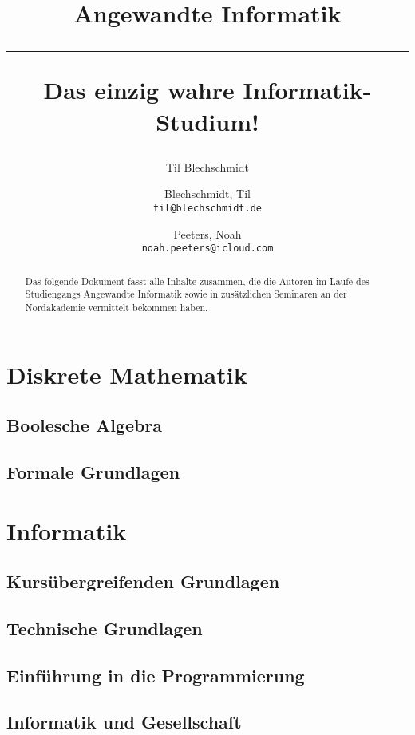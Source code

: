 \documentclass[a4paper]{report}
\title{Angewandte Informatik \\
    \noindent\rule[0.25ex]{\linewidth}{0.5pt}
    \large Das einzig wahre Informatik-Studium!
}
\author{Til Blechschmidt}
\author{
  Blechschmidt, Til\\
  \texttt{til@blechschmidt.de}
  \and
  Peeters, Noah\\
  \texttt{noah.peeters@icloud.com}
}
\begin{document}
	\thispagestyle{fancy}
	\maketitle

 	\begin{abstract}
         Das folgende Dokument fasst alle Inhalte zusammen, die die Autoren im Laufe des Studiengangs Angewandte Informatik sowie in zusätzlichen Seminaren an der Nordakademie vermittelt bekommen haben.
 	\end{abstract}
 	\newpage

	\tableofcontents

	\part{Diskrete Mathematik}
	    \chapter{Boolesche Algebra}
	        
	    \chapter{Formale Grundlagen}
	        
	        
    \part{Informatik}
        \chapter{Kursübergreifenden Grundlagen}
            
        \chapter{Technische Grundlagen}
            
        \chapter{Einführung in die Programmierung}
            
        \chapter{Informatik und Gesellschaft}
            
	        
\end{document}
